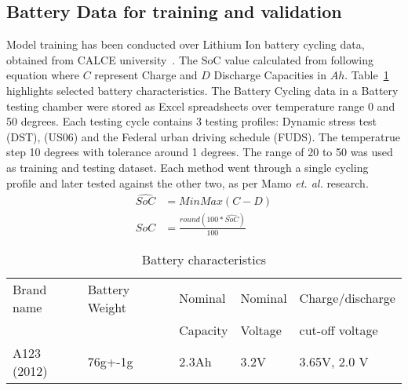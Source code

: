 
\subsection{Battery Data for training and validation}
Model training has been conducted over Lithium Ion battery cycling data, obtained from CALCE university~\cite{noauthor_calce_2017}.
The SoC value calculated from following equation where $C$ represent Charge and $D$ Discharge Capacities in $Ah$.
Table~\ref{tab:battery} highlights selected battery characteristics.
The Battery Cycling data in a Battery testing chamber were stored as Excel spreadsheets over temperature range 0 and 50 degrees.
Each testing cycle contains 3 testing profiles: Dynamic stress test (DST), (US06) and the Federal urban driving schedule (FUDS).
The temperatrue step 10 degrees with tolerance around 1 degrees.
The range of 20 to 50 was used as training and testing dataset.
Each method went through a single cycling profile and later tested against the other two, as per Mamo \textit{et. al.} \cite{mamo_long_2020} research.
\begin{equation}
    \begin{split}
        \hat{SoC} &= MinMax(C-D) \\
        SoC &= \frac{round(100*\hat{SoC})}{100}
    \end{split}
\end{equation}
\begin{table}[ht]
    \centering
    \caption{Battery characteristics}
    \label{tab:battery}
    \begin{tabular}{ p{2.7cm} p{2.7cm} p{2.7cm} p{2.7cm} p{2.7cm}   }
        \hline
        Brand name & Battery Weight & Nominal  & Nominal & Charge/discharge\\
                   &                & Capacity & Voltage & cut-off voltage \\
        \hline
        A123 (2012) & 76g+-1g & 2.3Ah & 3.2V & 3.65V, 2.0 V\\
        \hline
    \end{tabular}
\end{table}
